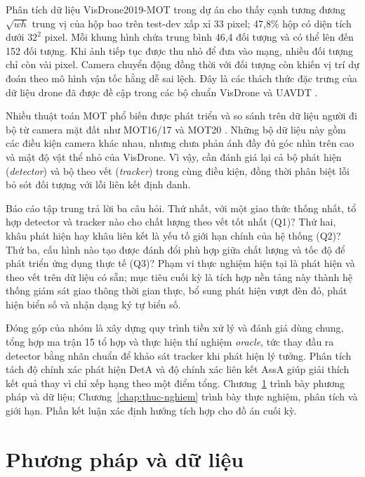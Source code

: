 \documentclass[fontsize=13pt,a4paper,oneside,parskip=false,numbers=noenddot,bibliography=totoc]{scrreprt}
\begin{document}
Phân tích dữ liệu VisDrone2019-MOT trong dự án cho thấy cạnh tương đương $\sqrt{wh}$ trung vị của hộp bao trên test-dev xấp xỉ 33 pixel; 47,8\% hộp có diện tích dưới $32^2$ pixel. Mỗi khung hình chứa trung bình 46,4 đối tượng và có thể lên đến 152 đối tượng. Khi ảnh tiếp tục được thu nhỏ để đưa vào mạng, nhiều đối tượng chỉ còn vài pixel. Camera chuyển động đồng thời với đối tượng còn khiến vị trí dự đoán theo mô hình vận tốc hằng dễ sai lệch. Đây là các thách thức đặc trưng của dữ liệu drone đã được đề cập trong các bộ chuẩn VisDrone và UAVDT \cite{wen2019visdronemot,du2018uavdt}.

Nhiều thuật toán MOT phổ biến được phát triển và so sánh trên dữ liệu người đi bộ từ camera mặt đất như MOT16/17 và MOT20 \cite{milan2016mot16,dendorfer2020mot20}. Những bộ dữ liệu này gồm các điều kiện camera khác nhau, nhưng chưa phản ánh đầy đủ góc nhìn trên cao và mật độ vật thể nhỏ của VisDrone. Vì vậy, cần đánh giá lại cả bộ phát hiện (\textit{detector}) và bộ theo vết (\textit{tracker}) trong cùng điều kiện, đồng thời phân biệt lỗi bỏ sót đối tượng với lỗi liên kết định danh.

Báo cáo tập trung trả lời ba câu hỏi. Thứ nhất, với một giao thức thống nhất, tổ hợp detector và tracker nào cho chất lượng theo vết tốt nhất (Q1)? Thứ hai, khâu phát hiện hay khâu liên kết là yếu tố giới hạn chính của hệ thống (Q2)? Thứ ba, cấu hình nào tạo được đánh đổi phù hợp giữa chất lượng và tốc độ để phát triển ứng dụng thực tế (Q3)? Phạm vi thực nghiệm hiện tại là phát hiện và theo vết trên dữ liệu có sẵn; mục tiêu cuối kỳ là tích hợp nền tảng này thành hệ thống giám sát giao thông thời gian thực, bổ sung phát hiện vượt đèn đỏ, phát hiện biển số và nhận dạng ký tự biển số.

Đóng góp của nhóm là xây dựng quy trình tiền xử lý và đánh giá dùng chung, tổng hợp ma trận 15 tổ hợp và thực hiện thí nghiệm \textit{oracle}, tức thay đầu ra detector bằng nhãn chuẩn để khảo sát tracker khi phát hiện lý tưởng. Phân tích tách độ chính xác phát hiện DetA và độ chính xác liên kết AssA giúp giải thích kết quả thay vì chỉ xếp hạng theo một điểm tổng. Chương~\ref{chap:phuong-phap} trình bày phương pháp và dữ liệu; Chương~\ref{chap:thuc-nghiem} trình bày thực nghiệm, phân tích và giới hạn. Phần kết luận xác định hướng tích hợp cho đồ án cuối kỳ.



\chapter{Phương pháp và dữ liệu}
\label{chap:phuong-phap}
\end{document}
